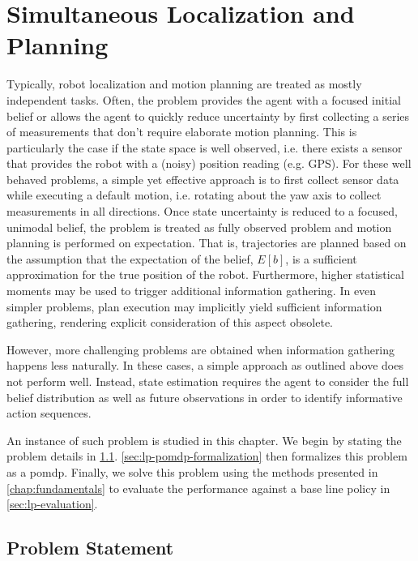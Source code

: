 \chapter{Simultaneous Localization and Planning}\label{chap:localization-and-planning}

Typically, robot localization and motion planning are treated as mostly
independent tasks. Often, the problem provides the agent with a focused initial
belief or allows the agent to quickly reduce uncertainty by first collecting
a series of measurements that don't require elaborate motion planning. This is
particularly the case if the state space is well observed, i.e. there exists
a sensor that provides the robot with a (noisy) position reading (e.g. GPS).
For these well behaved problems, a simple yet effective approach is to first
collect sensor data while executing a default motion, i.e. rotating about the
yaw axis to collect measurements in all directions. Once state uncertainty is
reduced to a focused, unimodal belief, the problem is treated as fully observed
problem and motion planning is performed on expectation. That is, trajectories
are planned based on the assumption that the expectation of the belief, $E[b]$,
is a sufficient approximation for the true position of the robot. Furthermore,
higher statistical moments  may be used
to trigger additional information gathering. In even simpler problems, plan
execution may implicitly yield sufficient information gathering, rendering
explicit consideration of this aspect obsolete.

However, more challenging problems are obtained when information gathering
happens less naturally. In these cases, a simple approach as outlined above
does not perform well. Instead, state estimation requires the agent to consider
the full belief distribution as well as future observations in order to
identify informative action sequences.


An instance of such problem is studied in this chapter. We begin by stating the
problem details in \cref{sec:lp-problem-statement}.
\cref{sec:lp-pomdp-formalization} then formalizes this problem as a \ac{pomdp}.
Finally, we solve this problem using the methods presented in
\cref{chap:fundamentals} to evaluate the performance against a base
line policy in \cref{sec:lp-evaluation}.

\section{Problem Statement}\label{sec:lp-problem-statement}

